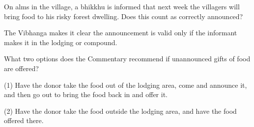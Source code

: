 \bigskip

On alms in the village, a bhikkhu is informed that next week the villagers will
bring food to his risky forest dwelling. Does this count as correctly announced?

\begin{solution}
  The Vibhanga makes it clear the announcement is valid only if the informant
  makes it in the lodging or compound.
\end{solution}

\bigskip

What two options does the Commentary recommend if unannounced gifts of food are offered?

\begin{solution}
  (1) Have the donor take the food out of the lodging area, come and announce it,
  and then go out to bring the food back in and offer it.
 
  (2) Have the donor take the food outside the lodging area, and have the food
  offered there.
\end{solution}
